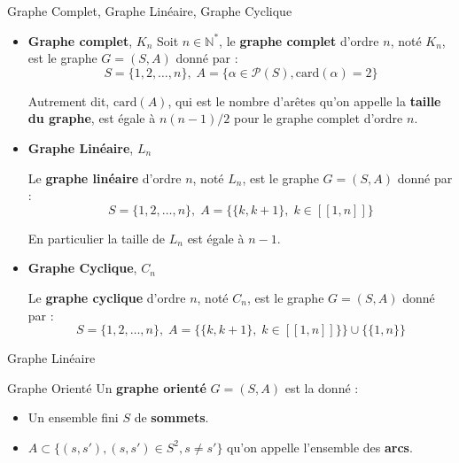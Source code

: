 \begin{Definition}[colbacktitle=red!75!black]{Graphe Complet, Graphe Linéaire, Graphe Cyclique}{}

\begin{itemize}
    \item \textbf{Graphe complet}, $K_n$
        Soit $n \in \mathbb{N} ^*$, le \textbf{graphe complet} d'ordre $n$, noté $K_n$, est le graphe $G=(S,A)$ donné par :
 \[
     S = \{1,2,\ldots,n\},\; A = \{ \alpha \in \mathcal{P} (S) , \mathrm{car d} ( \alpha ) =2\}
\]

Autrement dit, $\mathrm{car d} (A)$, qui est le nombre d'arêtes qu'on appelle la \textbf{taille du graphe}, est égale à $n(n-1) / 2$ pour le graphe complet d'ordre $n$.
\item \textbf{Graphe Linéaire}, $L_n$

Le \textbf{graphe linéaire} d'ordre $n$, noté $L_n$, est le graphe $G = (S,A)$ donné par :
 \[
     S = \{1, 2, \ldots, n\},\; A = \{\{k, k+1\}, \; k \in [\![1,n]\!]\}
\]

En particulier la taille de $L_n$ est égale à $n-1$.

\item \textbf{Graphe Cyclique}, $C_n$

Le \textbf{graphe cyclique} d'ordre $n$, noté $C_n$, est le graphe $G = (S,A)$ donné par :
 \[
 S = \{1, 2, \ldots, n\},\; A = \{\{k, k+1\}, \; k \in [\![1,n]\!]\} \}\cup \{\{1,n\}\}
\]
\end{itemize}
\end{Definition}

\begin{Example}{Graphe Linéaire}{}
\begin{center}
\end{center}
\end{Example}

\begin{Definition}[colbacktitle=red!75!black]{Graphe Orienté}{}
Un \textbf{graphe orienté} $G=(S,A)$ est la donné :
 \begin{itemize}
    \item Un ensemble fini $S$ de \textbf{sommets}.
    \item $A \subset \{(s,s'), (s,s') \in S^2, s \ne s'\}$ qu'on appelle l'ensemble des \textbf{arcs}.
\end{itemize}
\end{Definition}

